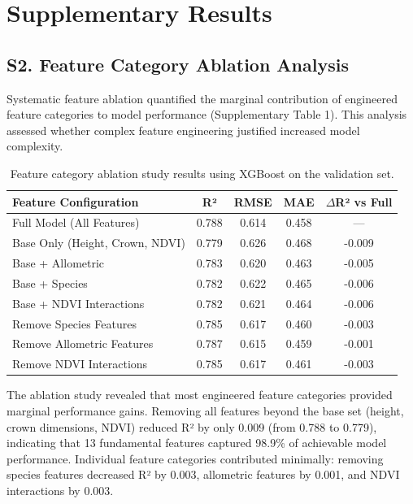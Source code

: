 \section*{Supplementary Results}

\subsection*{S2. Feature Category Ablation Analysis}

Systematic feature ablation quantified the marginal contribution of engineered feature categories to model performance (Supplementary Table 1). This analysis assessed whether complex feature engineering justified increased model complexity.

\begin{table}[ht!]
    \centering
    \caption{Feature category ablation study results using XGBoost on the validation set.}
    \label{tab:supp_ablation}
    \begin{tabular}{lcccc}
        \toprule
        Feature Configuration & R² & RMSE & MAE & $\Delta$R² vs Full \\
        \midrule
        Full Model (All Features) & 0.788 & 0.614 & 0.458 & --- \\
        Base Only (Height, Crown, NDVI) & 0.779 & 0.626 & 0.468 & -0.009 \\
        Base + Allometric & 0.783 & 0.620 & 0.463 & -0.005 \\
        Base + Species & 0.782 & 0.622 & 0.465 & -0.006 \\
        Base + NDVI Interactions & 0.782 & 0.621 & 0.464 & -0.006 \\
        Remove Species Features & 0.785 & 0.617 & 0.460 & -0.003 \\
        Remove Allometric Features & 0.787 & 0.615 & 0.459 & -0.001 \\
        Remove NDVI Interactions & 0.785 & 0.617 & 0.461 & -0.003 \\
        \bottomrule
    \end{tabular}
\end{table}

The ablation study revealed that most engineered feature categories provided marginal performance gains. Removing all features beyond the base set (height, crown dimensions, NDVI) reduced R² by only 0.009 (from 0.788 to 0.779), indicating that 13 fundamental features captured 98.9\% of achievable model performance. Individual feature categories contributed minimally: removing species features decreased R² by 0.003, allometric features by 0.001, and NDVI interactions by 0.003.

